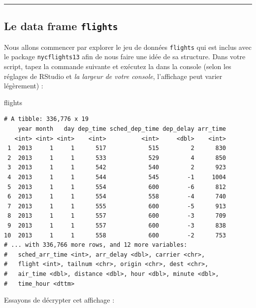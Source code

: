 \documentclass[a4paperpaper,]{article}
\newenvironment{Shaded}{\begin{snugshade}}{\end{snugshade}}
\newcommand{\NormalTok}[1]{\textcolor[rgb]{0.12,0.11,0.11}{#1}}
\begin{document}
\begin{center}\rule{0.5\linewidth}{\linethickness}\end{center}

\hypertarget{le-data-frame-flights}{%
\subsection{\texorpdfstring{Le data frame \texttt{flights}}{Le data frame flights}}\label{le-data-frame-flights}}

Nous allons commencer par explorer le jeu de données \texttt{flights} qui est inclus avec le package \texttt{nycflights13} afin de nous faire une idée de sa structure. Dans votre script, tapez la commande suivante et exécutez la dans la console (selon les réglages de RStudio et \emph{la largeur de votre console}, l'affichage peut varier légèrement) :

\begin{Shaded}
\begin{Highlighting}[]
\NormalTok{flights}
\end{Highlighting}
\end{Shaded}

\begin{verbatim}
# A tibble: 336,776 x 19
    year month   day dep_time sched_dep_time dep_delay arr_time
   <int> <int> <int>    <int>          <int>     <dbl>    <int>
 1  2013     1     1      517            515         2      830
 2  2013     1     1      533            529         4      850
 3  2013     1     1      542            540         2      923
 4  2013     1     1      544            545        -1     1004
 5  2013     1     1      554            600        -6      812
 6  2013     1     1      554            558        -4      740
 7  2013     1     1      555            600        -5      913
 8  2013     1     1      557            600        -3      709
 9  2013     1     1      557            600        -3      838
10  2013     1     1      558            600        -2      753
# ... with 336,766 more rows, and 12 more variables:
#   sched_arr_time <int>, arr_delay <dbl>, carrier <chr>,
#   flight <int>, tailnum <chr>, origin <chr>, dest <chr>,
#   air_time <dbl>, distance <dbl>, hour <dbl>, minute <dbl>,
#   time_hour <dttm>
\end{verbatim}

Essayons de décrypter cet affichage :
\end{document}
